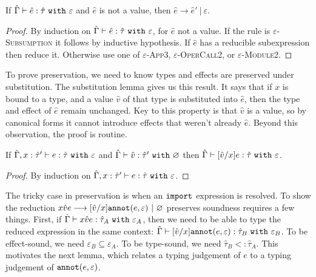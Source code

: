 \begin{theorem}[Progress]
If $\hat \Gamma \vdash \hat e: \hat \tau~\mathtt{with}~ \varepsilon$ and $\hat e$ is not a value, then $\hat e \longrightarrow \hat e'~|~\varepsilon$.
\end{theorem}

\begin{proof} By induction on $\hat \Gamma \vdash \hat e: \hat \tau~\mathtt{with}~ \varepsilon$, for $\hat e$ not a value. If the rule is \textsc{$\varepsilon$-Subsumption} it follows by inductive hypothesis. If $\hat e$ has a reducible subexpression then reduce it. Otherwise use one of \textsc{$\varepsilon$-App3}, \textsc{$\varepsilon$-OperCall2}, or \textsc{$\varepsilon$-Module2}.
\end{proof}

\noindent
To prove preservation, we need to know types and effects are preserved under substitution. The substitution lemma gives us this result. It says that if $x$ is bound to a type, and a value $\hat v$ of that type is substituted into $\hat e$, then the type and effect of $\hat e$ remain unchanged. Key to this property is that $\hat v$ is a value, so by canonical forms it cannot introduce effects that weren't already $\hat e$. Beyond this observation, the proof is routine.

\begin{lemma}[Substitution]
If $\hat \Gamma, x: \hat \tau' \vdash e: \hat \tau~\mathtt{with}~ \varepsilon$ and $\hat \Gamma \vdash \hat v: \hat \tau'~\mathtt{with}~ \varnothing$ then $\hat \Gamma \vdash [\hat v/x]e: \hat \tau~\mathtt{with}~ \varepsilon$.
\end{lemma}

\begin{proof} By induction on $\hat \Gamma, x: \hat \tau' \vdash e: \hat \tau~\mathtt{with}~ \varepsilon$.
\end{proof}

\noindent
The tricky case in preservation is when an $\mathtt{import}$ expression is resolved. To show the reduction ${x}{\hat v}{e} \longrightarrow [\hat v/x]\mathtt{annot}(e, \varepsilon)~|~\varnothing$ preserves soundness requires a few things. First, if $\hat \Gamma \vdash {x}{\hat v}{e}: \hat \tau_A~\mathtt{with}~ \varepsilon_A$, then we need to be able to type the reduced expression in the same context: $\hat \Gamma \vdash [\hat v/x]\mathtt{annot}(e, \varepsilon): \hat \tau_B~\mathtt{with}~ \varepsilon_B$. To be effect-sound, we need $\varepsilon_B \subseteq \varepsilon_A$. To be type-sound, we need $\hat \tau_B <: \hat \tau_A$. This motivates the next lemma, which relates a typing judgement of $e$ to a typing judgement of $\mathtt{annot}(e, \varepsilon)$.

